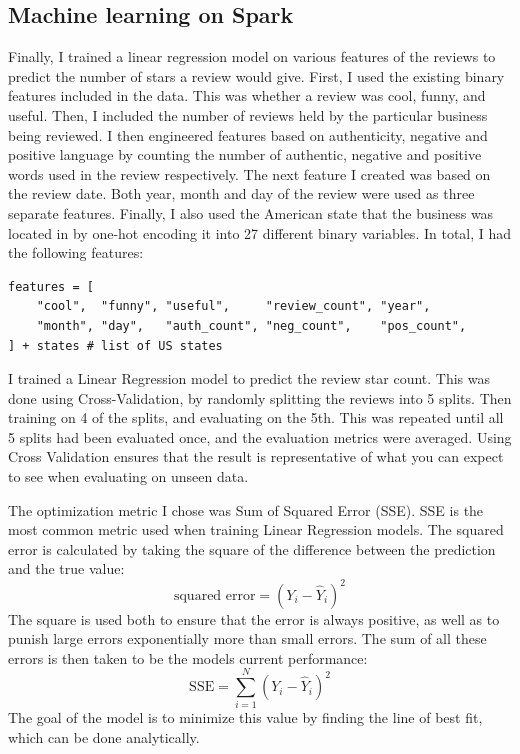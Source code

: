 \subsection{Machine learning on Spark}

Finally, I trained a linear regression model on various features of the reviews to predict the number of stars a review would give. First, I used the existing binary features included in the data. This was whether a review was cool, funny, and useful. Then, I included the number of reviews held by the particular business being reviewed. I then engineered features based on authenticity, negative and positive language by counting the number of authentic, negative and positive words used in the review respectively. The next feature I created was based on the review date. Both year, month and day of the review were used as three separate features. Finally, I also used the American state that the business was located in by one-hot encoding it into 27 different binary variables. In total, I had the following features:

\begin{verbatim}
features = [
    "cool",  "funny", "useful",     "review_count", "year",
    "month", "day",   "auth_count", "neg_count",    "pos_count",
] + states # list of US states
\end{verbatim}

I trained a Linear Regression model to predict the review star count. This was done using Cross-Validation, by randomly splitting the reviews into 5 splits. Then training on 4 of the splits, and evaluating on the 5th. This was repeated until all 5 splits had been evaluated once, and the evaluation metrics were averaged. Using Cross Validation ensures that the result is representative of what you can expect to see when evaluating on unseen data.

The optimization metric I chose was Sum of Squared Error (SSE). SSE is the most common metric used when training Linear Regression models. The squared error is calculated by taking the square of the difference between the prediction and the true value:
$$
\text{squared error}=\left(Y_i-\hat{Y}_i\right)^2
$$
The square is used both to ensure that the error is always positive, as well as to punish large errors exponentially more than small errors. The sum of all these errors is then taken to be the models current performance:
$$
\text{SSE}=\sum_{i=1}^N \left(Y_i-\hat{Y}_i\right)^2
$$
The goal of the model is to minimize this value by finding the line of best fit, which can be done analytically.

